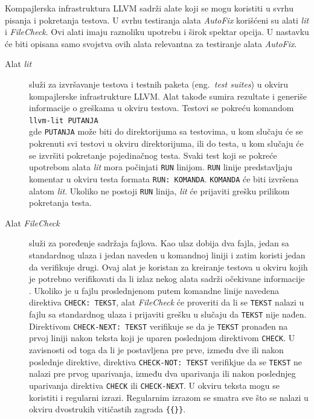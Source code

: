 \documentclass[12pt,oneside]{memoir}
\begin{document}
Kompajlerska infrastruktura LLVM sadr\v{z}i alate koji se mogu koristiti u svrhu pisanja i pokretanja testova. U svrhu testiranja alata \textit{AutoFix}
kori\v{s}\'{c}eni su alati \textit{lit} i \textit{FileCheck}. Ovi alati imaju raznoliku upotrebu i \v{s}irok spektar opcija. U nastavku \'{c}e biti opisana samo svojstva ovih alata relevantna za testiranje alata \textit{AutoFix}. \par
\begin{description}
\item[Alat \textit{lit}] slu\v{z}i za izvr\v{s}avanje testova i testnih paketa (eng.~\textit{test suites}) u okviru kompajlerske infrastrukture LLVM. Alat takođe sumira rezultate i generi\v{s}e informacije o gre\v{s}kama u okviru testova.
Testovi se pokre\'{c}u komandom \\
\texttt{llvm-lit PUTANJA}
\\
gde \texttt{PUTANJA} mo\v{z}e biti do direktorijuma sa testovima, u kom slu\v{c}aju \'{c}e se pokrenuti svi testovi u okviru direktorijuma, ili do testa, u kom slu\v{c}aju \'{c}e se izvr\v{s}iti pokretanje pojedina\v{c}nog testa.
Svaki test koji se pokre\'{c}e upotrebom alata \textit{lit} mora po\v{c}injati \texttt{RUN} linijom. \texttt{RUN} linije predstavljaju komentar u okviru testa formata \texttt{RUN: KOMANDA}. \texttt{KOMANDA} \'{c}e biti izvr\v{s}ena alatom \textit{lit}.
Ukoliko ne postoji \texttt{RUN} linija, \textit{lit} \'{c}e prijaviti gre\v{s}ku prilikom pokretanja testa. \par
  \item[Alat \textit{FileCheck}] slu\v{z}i za poređenje sadr\v{z}aja fajlova. Kao ulaz dobija dva fajla, jedan sa standardnog ulaza i jedan naveden u komandnoj liniji i zatim koristi jedan da verifikuje drugi. Ovaj alat je koristan za kreiranje testova u okviru kojih je potrebno verifikovati da li izlaz nekog alata sadr\v{z}i o\v{c}ekivane informacije \cite{FileCheck}. 
Ukoliko je u fajlu proslednjenom putem komandne linije navedena direktiva \texttt{CHECK: TEKST}, alat \textit{FileCheck} \'{c}e proveriti da li se \texttt{TEKST} nalazi u fajlu sa standardnog ulaza i prijaviti gre\v{s}ku u slu\v{c}aju da \texttt{TEKST} nije nađen.
Direktivom \texttt{CHECK-NEXT: TEKST} verifikuje se da je \texttt{TEKST} pronađen na prvoj liniji nakon teksta koji je uparen poslednjom direktivom \texttt{CHECK}. U zavisnosti od toga da li je postavljena pre prve, između dve ili nakon poslednje direktive, direktiva \texttt{CHECK-NOT: TEKST} verifikjue da se \texttt{TEKST} ne nalazi pre prvog uparivanja, između dva uparivanja ili nakon poslednjeg uparivanja direktiva \texttt{CHECK} ili \texttt{CHECK-NEXT}. U okviru teksta mogu se koristiti i regularni izrazi. Regularnim izrazom se smatra sve \v{s}to se nalazi u okviru dvostrukih viti\v{c}astih zagrada \texttt{\{\{\}\}}.
\end{description}
\end{document}
